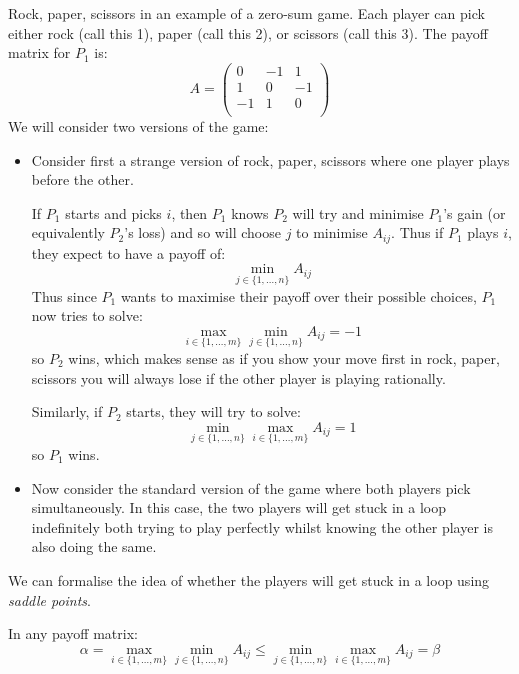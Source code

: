 \documentclass[../main.tex]{subfiles}
\begin{document}
\begin{example} \label{RPSExample}
  Rock, paper, scissors in an example of a zero-sum game.
  Each player can pick either rock (call this 1), paper (call this 2), or scissors (call this 3).
  The payoff matrix for $P_1$ is:
  \[
    A = \begin{pmatrix}
    0 & -1 & 1 \\
    1 & 0 & -1 \\
    -1 & 1 & 0 \\
    \end{pmatrix}
  \]
  We will consider two versions of the game:
  \begin{itemize}
    \item Consider first a strange version of rock, paper, scissors where one player plays before the other.

      If $P_1$ starts and picks $i$, then $P_1$ knows $P_2$ will try and minimise $P_1$'s gain (or equivalently $P_2$'s loss) and so will choose $j$ to minimise $A_{i j}$.
      Thus if $P_1$ plays $i$, they expect to have a payoff of:
      \[
        \min_{j \in \{1, \ldots, n\}} A_{i j}
      \]
      Thus since $P_1$ wants to maximise their payoff over their possible choices, $P_1$ now tries to solve:
      \[
        \max_{i \in \{1, \ldots, m\}} \min_{j \in \{1, \ldots, n\}} A_{i j} = -1
      \]
      so $P_2$ wins, which makes sense as if you show your move first in rock, paper, scissors you will always lose if the other player is playing rationally.

      Similarly, if $P_2$ starts, they will try to solve:
      \[
        \min_{j \in \{1, \ldots, n\}} \max_{i \in \{1, \ldots, m\}} A_{i j} = 1
      \]
      so $P_1$ wins.
    \item Now consider the standard version of the game where both players pick simultaneously.
      In this case, the two players will get stuck in a loop indefinitely both trying to play perfectly whilst knowing the other player is also doing the same.
  \end{itemize}
\end{example}
We can formalise the idea of whether the players will get stuck in a loop using \textit{saddle points}.
\begin{lemma}
  In any payoff matrix: \label{payoffEquality}
  \[
    \alpha = \max_{i \in \{1, \ldots, m\}} \min_{j \in \{1, \ldots, n\}} A_{i j} \leq \min_{j \in \{1, \ldots, n\}} \max_{i \in \{1, \ldots, m\}} A_{i j} = \beta
  \]
\end{lemma}
\end{document}
